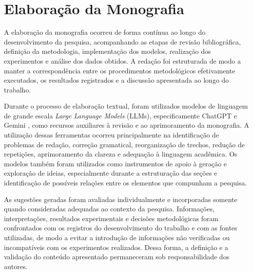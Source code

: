 \section{Elaboração da Monografia}
A elaboração da monografia ocorreu de forma contínua ao longo do desenvolvimento da pesquisa,
acompanhando as etapas de revisão bibliográfica, definição da metodologia, implementação dos
modelos, realização dos experimentos e análise dos dados obtidos. A redação foi estruturada de
modo a manter a correspondência entre os procedimentos metodológicos efetivamente executados,
os resultados registrados e a discussão apresentada ao longo do trabalho.

Durante o processo de elaboração textual, foram utilizados modelos de linguagem de grande
escala \textit{Large Language Models} (LLMs), especificamente ChatGPT
\cite{openai_chatgpt} e Gemini \cite{google_gemini}, como recursos auxiliares à revisão e ao
aprimoramento da monografia. A utilização dessas ferramentas ocorreu principalmente na
identificação de problemas de redação, correção gramatical, reorganização de trechos,
redução de repetições, aprimoramento da clareza e adequação à linguagem acadêmica. Os
modelos também foram utilizados como instrumentos de apoio à geração e exploração de ideias,
especialmente durante a estruturação das seções e identificação de possíveis relações entre
os elementos que compunham a pesquisa.

As sugestões geradas foram avaliadas individualmente e incorporadas somente quando consideradas
adequadas ao contexto da pesquisa. Informações, interpretações, resultados experimentais e
decisões metodológicas foram confrontados com os registros do desenvolvimento do trabalho e
com as fontes utilizadas, de modo a evitar a introdução de informações não verificadas ou
incompatíveis com os experimentos realizados. Dessa forma, a definição e a validação do conteúdo 
apresentado permaneceram sob responsabilidade dos autores.